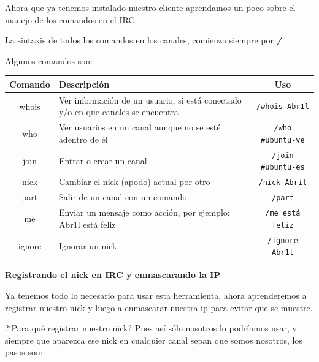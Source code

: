 \documentclass[12pt,letterpaper]{article}
\begin{document}
Ahora que ya tenemos instalado nuestro cliente aprendamos un poco sobre el manejo de los comandos en el IRC.

La sintaxis de todos los comandos en los canales, comienza siempre por {\bfseries\itshape /}

Algunos comandos son:

\begin{tabularx}{15cm}{||c|X|c||}
\hline\hline
\textbf{Comando} & \textbf{Descripci\'on}  & \textbf{Uso} \\
\hline \hline
whois & Ver informaci\'on de un usuario, si está conectado y/o en que canales se encuentra & \texttt{/whois Abr1l} \\
\hline
who & Ver usuarios en un canal aunque no se esté adentro de él & \texttt{/who \#ubuntu-ve} \\
\hline 
join & Entrar o crear un canal & \texttt{/join \#ubuntu-es} \\
\hline
nick & Cambiar el nick (apodo) actual por otro & \texttt{/nick Abril} \\
\hline
part & Salir de un canal con un comando & \texttt{/part} \\
\hline 
me & Enviar un mensaje como acci\'on, por ejemplo: Abr1l est\'a feliz & \texttt{/me est\'a feliz} \\
\hline
ignore & Ignorar un nick & \texttt{/ignore Abr1l} \\
\hline\hline
\end{tabularx} 

\begin{center} %
{\bf \large Registrando el nick en IRC y enmascarando la IP} %
\end{center}

Ya tenemos todo lo necesario para usar esta herramienta, ahora aprenderemos a registrar nuestro nick y luego a enmascarar nuestra ip para evitar que se muestre.

?`Para qu\'e registrar nuestro nick? Pues as\'i s\'olo nosotros lo podr\'iamos usar, y siempre que aparezca ese nick en cualquier canal sepan que somos nosotros, los pasos son: 
\end{document}
